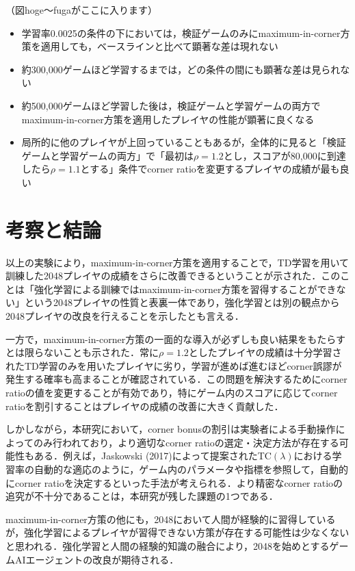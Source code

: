 \documentclass{suribt}
\begin{document}
（図hoge〜fugaがここに入ります）

\begin{itemize}
\item 学習率0.0025の条件の下においては，検証ゲームのみにmaximum-in-corner方策を適用しても，ベースラインと比べて顕著な差は現れない
\item 約300,000ゲームほど学習するまでは，どの条件の間にも顕著な差は見られない
\item 約500,000ゲームほど学習した後は，検証ゲームと学習ゲームの両方でmaximum-in-corner方策を適用したプレイヤの性能が顕著に良くなる
\item 局所的に他のプレイヤが上回っていることもあるが，全体的に見ると「検証ゲームと学習ゲームの両方」で「最初は${\rho}=1.2$とし，スコアが80,000に到達したら${\rho}=1.1$とする」条件でcorner ratioを変更するプレイヤの成績が最も良い
\end{itemize}

\chapter{考察と結論}
以上の実験により，maximum-in-corner方策を適用することで，TD学習を用いて訓練した2048プレイヤの成績をさらに改善できるということが示された．このことは「強化学習による訓練ではmaximum-in-corner方策を習得することができない」という2048プレイヤの性質と表裏一体であり，強化学習とは別の観点から2048プレイヤの改良を行えることを示したとも言える．

一方で，maximum-in-corner方策の一面的な導入が必ずしも良い結果をもたらすとは限らないことも示された．常に${\rho}=1.2$としたプレイヤの成績は十分学習されたTD学習のみを用いたプレイヤに劣り，学習が進めば進むほどcorner誤謬が発生する確率も高まることが確認されている．この問題を解決するためにcorner ratioの値を変更することが有効であり，特にゲーム内のスコアに応じてcorner ratioを割引することはプレイヤの成績の改善に大きく貢献した．

しかしながら，本研究において，corner bonusの割引は実験者による手動操作によってのみ行われており，より適切なcorner ratioの選定・決定方法が存在する可能性もある．例えば，Jaskowski (2017)によって提案されたTC$({\lambda})$における学習率の自動的な適応のように，ゲーム内のパラメータや指標を参照して，自動的にcorner ratioを決定するといった手法が考えられる．より精密なcorner ratioの追究が不十分であることは，本研究が残した課題の1つである．

maximum-in-corner方策の他にも，2048において人間が経験的に習得しているが，強化学習によるプレイヤが習得できない方策が存在する可能性は少なくないと思われる．強化学習と人間の経験的知識の融合により，2048を始めとするゲームAIエージェントの改良が期待される．
\end{document}
